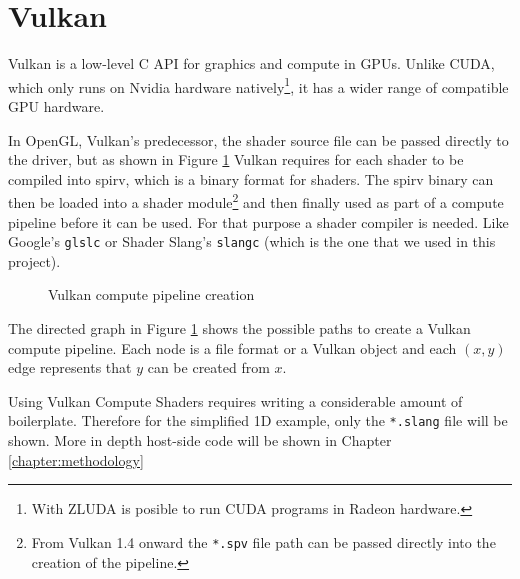 \documentclass[../main.tex]{subfiles}
\begin{document}
\section{Vulkan} \label{sec:method:vulkan}
Vulkan\cite{vulkanspec} is a low-level C API for graphics and compute in GPUs.
Unlike CUDA, which only runs on Nvidia hardware natively\footnote{With ZLUDA is posible to run CUDA programs in Radeon hardware.}, it has a wider range of compatible GPU hardware\cite{vulkandb}.

In OpenGL, Vulkan's predecessor, the shader source file can be passed directly to the driver, but as shown in Figure \ref{fig:vulkan_compute_pipeline} Vulkan requires
for each shader to be compiled into spirv, which is a binary format for shaders.
The spirv binary can then be loaded into a shader module\footnote{From Vulkan 1.4 onward the \texttt{*.spv} file path can be passed directly into the creation of the pipeline.} and then finally used as part of a compute pipeline before it can be used.
For that purpose a shader compiler is needed.
Like Google's \texttt{glslc}\cite{shaderc} or Shader Slang's \texttt{slangc}\cite{10.1145/3197517.3201380} (which is the one that we used in this project).


\begin{figure}[H]
	\centering
	\caption{Vulkan compute pipeline creation}
	\label{fig:vulkan_compute_pipeline}
\end{figure}

The directed graph in Figure \ref{fig:vulkan_compute_pipeline} shows the possible paths to create a Vulkan compute pipeline.
Each node is a file format or a Vulkan object
and each $(x,y)$ edge represents that $y$ can be created from $x$.

Using Vulkan Compute Shaders requires writing a considerable amount of boilerplate.
Therefore for the simplified 1D example, only the \texttt{*.slang} file will be shown.
More in depth host-side code will be shown in Chapter \ref{chapter:methodology}
\end{document}
